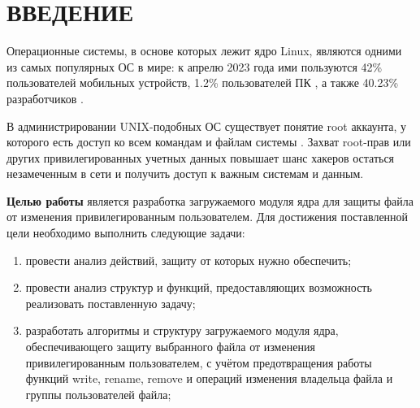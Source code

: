 \section*{\large ВВЕДЕНИЕ}

Операционные системы, в основе которых лежит ядро Linux, являются одними из самых популярных ОС в мире: к апрелю 2023 года ими пользуются 42\% пользователей мобильных устройств, 1.2\% пользователей ПК \cite{linux-statistics-2023}, а также 40.23\% разработчиков \cite{linux-dev-stats-stackoverflow}. 

В администрировании UNIX-подобных ОС существует понятие root аккаунта, у которого есть доступ ко всем командам и файлам системы \cite{root-definition}.
Захват root-прав или других привилегированных учетных данных повышает шанс хакеров остаться  незамеченным в сети и получить доступ к важным системам и данным.

\textbf{Целью работы} является разработка загружаемого модуля ядра для защиты файла от изменения привилегированным пользователем.
Для достижения поставленной цели необходимо выполнить следующие задачи:
\begin{enumerate}[label=\arabic*)]
	\item провести анализ действий, защиту от которых нужно обеспечить;
	\item провести анализ структур и функций, предоставляющих возможность реализовать поставленную задачу;
	\item разработать алгоритмы и структуру загружаемого модуля ядра, обеспечивающего защиту выбранного файла от  изменения привилегированным пользователем, с учётом предотвращения работы функций write, rename, remove и операций изменения владельца файла и группы пользователей файла;
\end{enumerate}

